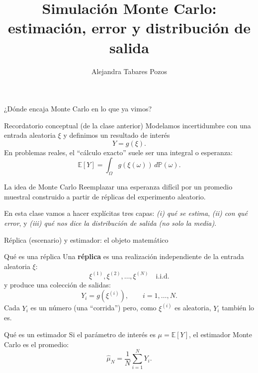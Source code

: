 \documentclass[aspectratio=1610, 9pt]{beamer}
\title[Simulación Monte Carlo: estimación,…]{Simulación Monte Carlo: estimación, error y distribución de salida}
\subtitle{}
\author{Alejandra Tabares Pozos}
\institute{Universidad de los Andes \\
 Departamento de Ingeniería Industrial}
\date{}
\begin{document}
\begin{frame}
  \titlepage
\end{frame}

\begin{frame}{¿Dónde encaja Monte Carlo en lo que ya vimos?}
\begin{block}{Recordatorio conceptual (de la clase anterior)}
Modelamos incertidumbre con una entrada aleatoria $\xi$ y definimos un resultado de interés
\[
Y = g(\xi).
\]
En problemas reales, el ``cálculo exacto'' suele ser una integral o esperanza:
\[
\mathbb E[Y] = \int_\Omega g(\xi(\omega))\, d\mathbb P(\omega).
\]
\end{block}

\begin{alertblock}{La idea de Monte Carlo}
Reemplazar una esperanza difícil por un promedio muestral construido a partir de réplicas del experimento aleatorio.
\end{alertblock}

\medskip
En esta clase vamos a hacer explícitas tres capas: \emph{(i) qué se estima}, \emph{(ii) con qué error}, y \emph{(iii) qué nos dice la distribución de salida (no solo la media)}.
\end{frame}

\begin{frame}{Réplica (escenario) y estimador: el objeto matemático}
\begin{block}{Qué es una réplica}
Una \textbf{réplica} es una realización independiente de la entrada aleatoria $\xi$:
\[
\xi^{(1)},\xi^{(2)},\dots,\xi^{(N)} \quad \text{i.i.d.}
\]
y produce una colección de salidas:
\[
Y_i = g\!\left(\xi^{(i)}\right),\qquad i=1,\dots,N.
\]
Cada $Y_i$ es un número (una ``corrida'') pero, como $\xi^{(i)}$ es aleatoria, $Y_i$ también lo es.
\end{block}

\begin{block}{Qué es un estimador}
Si el parámetro de interés es $\mu=\mathbb E[Y]$, el estimador Monte Carlo es el promedio:
\[
\widehat\mu_N=\frac{1}{N}\sum_{i=1}^N Y_i.
\]
\end{block}

\end{frame}
\end{document}
